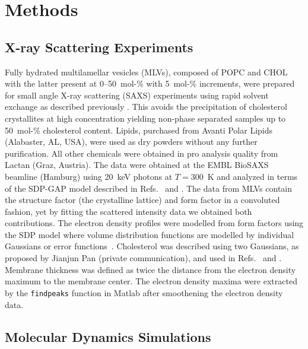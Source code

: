 \documentclass[journal=jctcce]{achemso}
\begin{document}
\section{Methods}

\subsection{X-ray Scattering Experiments}
Fully hydrated multilamellar vesicles (MLVs), composed of POPC and CHOL with the latter present at 0--50~mol-\% with 5~mol-\% increments, were prepared for small angle X-ray scattering (SAXS) experiments using rapid solvent exchange as described previously \cite{rieder2015optimizing,belivcka2017high} . This avoids the precipitation of cholesterol crystallites at high concentration \cite{buboltz1999novel} yielding non-phase separated samples up to 50~mol-\% cholesterol content. Lipids, purchased from Avanti Polar Lipids (Alabaster, AL, USA), were used as dry powders without any further purification. All other chemicals were obtained in pro analysis quality from Lactan (Graz, Austria). The data were obtained at the EMBL BioSAXS beamline (Hamburg) using 20~keV photons at $T=300$~K and analyzed in terms of the SDP-GAP model described in Refs.~ and . The data from MLVs contain the structure factor (the crystalline lattice) and form factor in a convoluted fashion, yet by fitting the scattered intensity data we obtained both contributions. The electron density profiles were modelled from form factors using the SDP model where volume distribution functions are modelled by individual Gaussians or error functions~\cite{heberle12,Kucerka08a,kucerka12}. 
Cholesterol was described using two Gaussians, as proposed by Jianjun Pan (private communication), and used in Refs.~ and . 
Membrane thickness was defined as twice the distance from the electron density maximum to the membrane center. The electron density maxima were extracted by the \texttt{findpeaks} function in Matlab after smoothening the electron density data.

\subsection{Molecular Dynamics Simulations}
\end{document}
